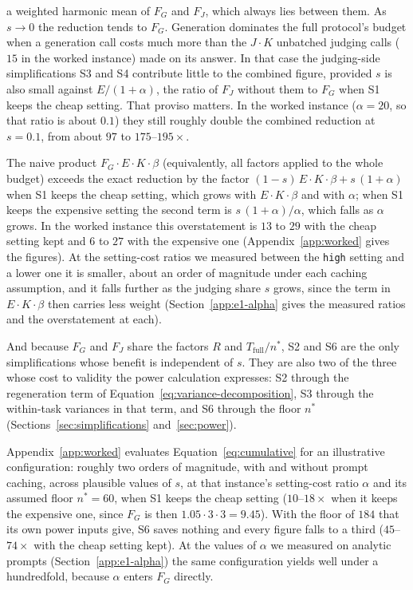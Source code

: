 \documentclass[11pt]{article}
\begin{document}
a weighted harmonic mean of $F_G$ and $F_J$, which always lies between them. As $s \to 0$ the reduction tends to $F_G$. Generation dominates the full protocol's budget when a generation call costs much more than the $J \cdot K$ unbatched judging calls ($15$ in the worked instance) made on its answer. In that case the judging-side
simplifications S3 and S4 contribute little to the combined figure, provided $s$ is also small against $E/(1+\alpha)$, the ratio of $F_J$ without them to $F_G$ when S1 keeps the cheap setting. That proviso matters. In the worked instance ($\alpha = 20$, so that ratio is about $0.1$) they still roughly double the combined reduction at $s = 0.1$, from about $97$ to $175$--$195\times$.

The naive product $F_G \cdot E \cdot K \cdot \beta$ (equivalently, all factors applied to the whole budget) exceeds the exact reduction by the factor $(1-s)\,E \cdot K \cdot \beta + s\,(1+\alpha)$ when S1 keeps the cheap setting, which grows with $E \cdot K \cdot \beta$ and with $\alpha$; when S1 keeps the expensive setting the second term is $s\,(1+\alpha)/\alpha$, which falls as $\alpha$ grows. In the worked instance this overstatement is $13$ to $29$ with the cheap setting kept and $6$ to $27$ with the expensive one (Appendix~\ref{app:worked} gives the figures). At the setting-cost ratios we measured between the \texttt{high} setting and a lower one it is smaller, about an order of magnitude under each caching assumption, and it falls further as the judging share $s$ grows, since the term in $E \cdot K \cdot \beta$ then carries less weight (Section~\ref{app:e1-alpha} gives the measured ratios and the overstatement at each).

And because $F_G$ and $F_J$ share the factors $R$ and
$T_{\text{full}}/n^*$, S2 and S6 are the only simplifications whose benefit is
independent of $s$. They are also two of the three whose cost to validity the power calculation expresses: S2 through the regeneration term of Equation~\ref{eq:variance-decomposition}, S3 through the within-task variances in that term, and S6 through the floor $n^*$ (Sections~\ref{sec:simplifications} and~\ref{sec:power}).

Appendix~\ref{app:worked} evaluates Equation~\ref{eq:cumulative} for an illustrative configuration: roughly two orders of magnitude, with and without prompt caching, across plausible values of $s$, at that instance's setting-cost ratio $\alpha$ and its assumed floor $n^* = 60$, when S1 keeps the cheap setting ($10$--$18\times$ when it keeps the expensive one, since $F_G$ is then $1.05 \cdot 3 \cdot 3 = 9.45$). With the floor of $184$ that its own power inputs give, S6 saves nothing and every figure falls to a third ($45$--$74\times$ with the cheap setting kept). At the values of $\alpha$ we measured on analytic prompts (Section~\ref{app:e1-alpha}) the same configuration yields well under a hundredfold, because $\alpha$ enters $F_G$ directly.
\end{document}
